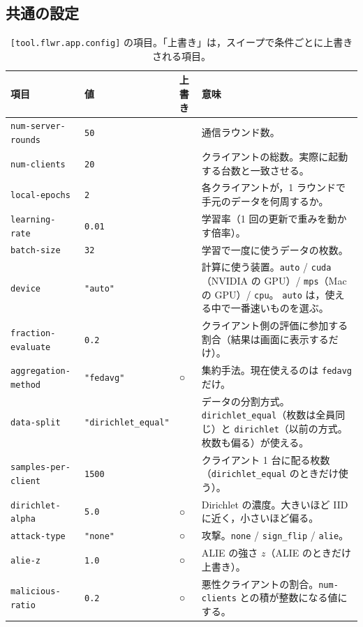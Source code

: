 \documentclass[a4j, dvipdfmx]{jsarticle}  %
\begin{document}
\subsection{共通の設定}

\begin{table}[H]
\centering
\caption{\texttt{[tool.flwr.app.config]} の項目。「上書き」は，スイープで条件ごとに上書きされる項目。}
\label{tab:config}
\small
\begin{tabular}{@{}P{3.5cm} P{2.0cm} P{1.2cm} P{8.2cm}@{}}
\toprule
項目 & 値 & 上書き & 意味 \\
\midrule
\texttt{num-server-rounds} & \texttt{50} & & 通信ラウンド数。 \\
\texttt{num-clients} & \texttt{20} & & クライアントの総数。実際に起動する台数と一致させる。 \\
\texttt{local-epochs} & \texttt{2} & & 各クライアントが，1 ラウンドで手元のデータを何周するか。 \\
\texttt{learning-rate} & \texttt{0.01} & & 学習率（1 回の更新で重みを動かす倍率）。 \\
\texttt{batch-size} & \texttt{32} & & 学習で一度に使うデータの枚数。 \\
\texttt{device} & \texttt{"auto"} & & 計算に使う装置。\texttt{auto} / \texttt{cuda}（NVIDIA の GPU）/ \texttt{mps}（Mac の GPU）/ \texttt{cpu}。
\texttt{auto} は，使える中で一番速いものを選ぶ。 \\
\texttt{fraction-evaluate} & \texttt{0.2} & & クライアント側の評価に参加する割合（結果は画面に表示するだけ）。 \\
\texttt{aggregation-method} & \texttt{"fedavg"} & ○ & 集約手法。現在使えるのは \texttt{fedavg} だけ。 \\
\texttt{data-split} & \texttt{"dirichlet\_equal"} & & データの分割方式。\texttt{dirichlet\_equal}（枚数は全員同じ）と \texttt{dirichlet}（以前の方式。枚数も偏る）が使える。 \\
\texttt{samples-per-client} & \texttt{1500} & & クライアント 1 台に配る枚数（\texttt{dirichlet\_equal} のときだけ使う）。 \\
\texttt{dirichlet-alpha} & \texttt{5.0} & ○ & Dirichlet の濃度。大きいほど IID に近く，小さいほど偏る。 \\
\texttt{attack-type} & \texttt{"none"} & ○ & 攻撃。\texttt{none} / \texttt{sign\_flip} / \texttt{alie}。 \\
\texttt{alie-z} & \texttt{1.0} & ○ & ALIE の強さ $z$（ALIE のときだけ上書き）。 \\
\texttt{malicious-ratio} & \texttt{0.2} & ○ & 悪性クライアントの割合。\texttt{num-clients} との積が整数になる値にする。

\end{tabular}
\end{table}
\end{document}

